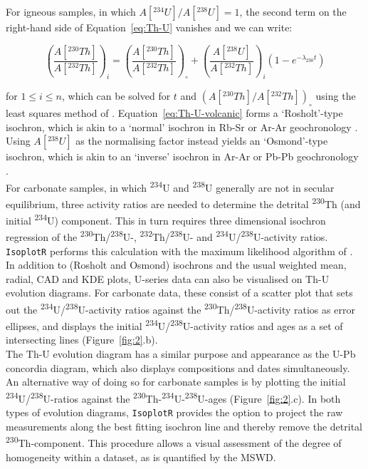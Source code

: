 \documentclass{article}
\begin{document}
For igneous samples, in which $A[{}^{234}U]/A[{}^{238}U] = 1$, the
second term on the right-hand side of Equation~\ref{eq:Th-U} vanishes
and we can write:

\begin{equation}
  \left(\frac{A[{}^{230}Th]}{A[{}^{232}Th]}\right)_i = 
  \left(\frac{A[{}^{230}Th]}{A[{}^{232}Th]}\right)_\circ +
  \left(\frac{A[{}^{238}U]}{A[{}^{232}Th]}\right)_i
  \left(1-e^{-\lambda_{230}t}\right)
  \label{eq:Th-U-volcanic}
\end{equation}

\noindent for $1 \leq i \leq n$, which can be solved for $t$ and
$\left(A[{}^{230}Th]/A[{}^{232}Th]\right)_\circ$ using the least
squares method of \citet{york2004}. Equation~\ref{eq:Th-U-volcanic}
forms a `Rosholt'-type isochron, which is akin to a `normal' isochron
in Rb-Sr or Ar-Ar geochronology \citep{rosholt1976}. Using
$A[{}^{238}U]$ as the normalising factor instead yields an
`Osmond'-type isochron, which is akin to an `inverse' isochron in
Ar-Ar or Pb-Pb geochronology \citep{osmond1970, ludwig2003b}.\\

For carbonate samples, in which \textsuperscript{234}U and
\textsuperscript{238}U generally are not in secular equilibrium, three
activity ratios are needed to determine the detrital
\textsuperscript{230}Th (and initial \textsuperscript{234}U)
component. This in turn requires three dimensional isochron regression
of the \textsuperscript{230}Th/\textsuperscript{238}U-,
\textsuperscript{232}Th/\textsuperscript{238}U- and
\textsuperscript{234}U/\textsuperscript{238}U-activity
ratios. \texttt{IsoplotR} performs this calculation with the maximum
likelihood algorithm of \citet{ludwig1994}.\\

In addition to (Rosholt and Osmond) isochrons and the usual weighted
mean, radial, CAD and KDE plots, U-series data can also be visualised
on Th-U evolution diagrams.  For carbonate data, these consist of a
scatter plot that sets out the
\textsuperscript{234}U/\textsuperscript{238}U-activity ratios against
the \textsuperscript{230}Th/\textsuperscript{238}U-activity ratios as
error ellipses, and displays the initial
\textsuperscript{234}U/\textsuperscript{238}U-activity ratios and ages
as a set of intersecting lines (Figure~\ref{fig:2}.b).\\

The Th-U evolution diagram has a similar purpose and appearance as the
U-Pb concordia diagram, which also displays compositions and dates
simultaneously. An alternative way of doing so for carbonate samples
is by plotting the initial
\textsuperscript{234}U/\textsuperscript{238}U-ratios against the
\textsuperscript{230}Th-\textsuperscript{234}U-\textsuperscript{238}U-ages
(Figure~\ref{fig:2}.c).  In both types of evolution diagrams,
\texttt{IsoplotR} provides the option to project the raw measurements
along the best fitting isochron line and thereby remove the detrital
\textsuperscript{230}Th-component. This procedure allows a visual
assessment of the degree of homogeneity within a dataset, as is
quantified by the MSWD.\\
\end{document}
